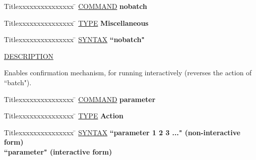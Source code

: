 \begin{tabbing}
Titlexxxxxxxxxxxxxxx \= \kill
\underline{COMMAND} \> {\bf 	nobatch} \\
\end{tabbing}

\begin{tabbing}
Titlexxxxxxxxxxxxxxx \= \kill
\underline{TYPE} \> {\bf 		Miscellaneous} \\
\end{tabbing}

\begin{tabbing}
Titlexxxxxxxxxxxxxxx \= \kill
\underline{SYNTAX} \> {\bf 		``nobatch"} \\
\end{tabbing}

\underline{DESCRIPTION}
\begin{list}{}{\setlength{\leftmargin}{0.5in}
     \setlength{\rightmargin}{0in}}
\item
Enables confirmation mechanism, for running interactively
(reverses the action of ``batch").
\end{list}
\vspace{.2in}

\begin{tabbing}
Titlexxxxxxxxxxxxxxx \= \kill
\underline{COMMAND} \> {\bf 	parameter} \\
\end{tabbing}

\begin{tabbing}
Titlexxxxxxxxxxxxxxx \= \kill
\underline{TYPE} \> {\bf 		Action} \\
\end{tabbing}

\begin{tabbing}
Titlexxxxxxxxxxxxxxx \= \kill
\underline{SYNTAX} \> {\bf 		``parameter 1 2 3 ..."	(non-interactive form)} \\
\> {\bf 		``parameter"		(interactive form)} \\
\end{tabbing}

